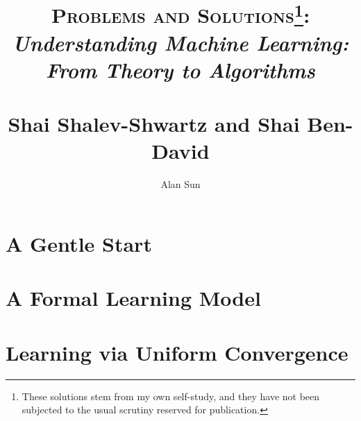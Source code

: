 \documentclass{report}
\title{\textsc{Problems and Solutions\footnote{These solutions stem from my own self-study, and they have not been subjected to the usual scrutiny reserved for publication.}:} \\ 
\textit{Understanding Machine Learning: From Theory to Algorithms} \\ 
~\\ \large Shai Shalev-Shwartz and Shai Ben-David}
\author{Alan Sun}
\date{}
\begin{document}
\maketitle

\tableofcontents

\setcounter{chapter}{1}
\chapter{A Gentle Start}


\chapter{A Formal Learning Model}


\chapter{Learning via Uniform Convergence}

\end{document}
